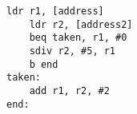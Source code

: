 \begin{lstlisting}[style=AsmStyle]    
    ldr r1, [address] 
    ldr r2, [address2]
    beq taken, r1, #0
    sdiv r2, #5, r1
    b end
taken:
    add r1, r2, #2
end:
\end{lstlisting}